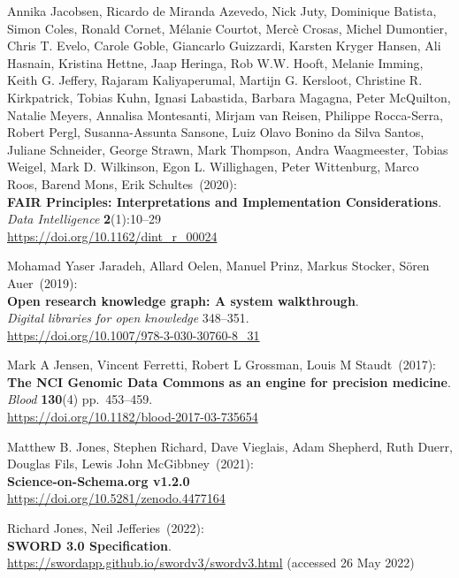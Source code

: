 \begin{thebibliography}{9}
Annika Jacobsen, Ricardo de Miranda Azevedo, Nick Juty, Dominique Batista, Simon Coles, Ronald Cornet, Mélanie Courtot, Mercè Crosas, Michel Dumontier, Chris T. Evelo, Carole Goble, Giancarlo Guizzardi, Karsten Kryger Hansen, Ali Hasnain, Kristina Hettne, Jaap Heringa, Rob W.W. Hooft, Melanie Imming, Keith G. Jeffery, Rajaram Kaliyaperumal, Martijn G. Kersloot, Christine R. Kirkpatrick, Tobias Kuhn, Ignasi Labastida, Barbara Magagna, Peter McQuilton, Natalie Meyers, Annalisa Montesanti, Mirjam van Reisen, Philippe Rocca-Serra, Robert Pergl, Susanna-Assunta Sansone, Luiz Olavo Bonino da Silva Santos, Juliane Schneider, George Strawn, Mark Thompson, Andra Waagmeester, Tobias Weigel, Mark D. Wilkinson, Egon L. Willighagen, Peter Wittenburg, Marco Roos, Barend Mons, Erik Schultes~(2020): \\
\textbf{FAIR Principles: Interpretations and Implementation Considerations}.\\
\emph{Data Intelligence} \textbf{2}(1):10--29\\
\url{https://doi.org/10.1162/dint_r_00024}

Mohamad Yaser Jaradeh, Allard Oelen, Manuel Prinz, Markus Stocker, Sören Auer~(2019): \\
\textbf{Open research knowledge graph: A system walkthrough}. \\
\emph{Digital libraries for open knowledge} 348--351.\\
\url{https://doi.org/10.1007/978-3-030-30760-8_31}

Mark A Jensen, Vincent Ferretti, Robert L Grossman, Louis M
Staudt~(2017): \\
\textbf{The NCI Genomic Data Commons as an engine for precision
medicine}.\\
\emph{Blood} \textbf{130}(4) pp.~453--459.\\
\url{https://doi.org/10.1182/blood-2017-03-735654}

Matthew B. Jones, Stephen Richard, Dave Vieglais, Adam
Shepherd, Ruth Duerr, Douglas Fils, Lewis John McGibbney~(2021): \\
\textbf{Science-on-Schema.org v1.2.0}\\
\url{https://doi.org/10.5281/zenodo.4477164}

Richard Jones, Neil Jefferies~(2022): \\
\textbf{SWORD 3.0 Specification}. \\
\url{https://swordapp.github.io/swordv3/swordv3.html} (accessed 26 May
2022)


\end{thebibliography}
